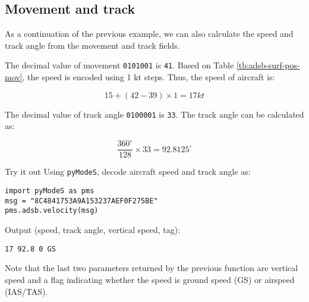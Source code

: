 \subsection{Movement and track}

As a continuation of the previous example, we can also calculate the speed and track angle from the movement and track fields.

The decimal value of movement \texttt{0101001} is \texttt{41}. Based on Table \ref{tb:adsb-surf-pos-mov}, the speed is encoded using 1 kt steps. Thus, the speed of aircraft is:

\begin{equation}
  15 + (42 - 39) \times 1 = 17 kt
\end{equation}

The decimal value of track angle \texttt{0100001} is \texttt{33}. The track angle can be calculated as:

\begin{equation}
  \frac{360^\circ}{128} \times 33 = 92.8125 ^\circ
\end{equation}

\begin{notebox}{Try it out}
Using \texttt{pyModeS}, decode aircraft speed and track angle as: 

\begin{verbatim}
import pyModeS as pms
msg = "8C4841753A9A153237AEF0F275BE"
pms.adsb.velocity(msg)
\end{verbatim}

Output (speed, track angle, vertical speed, tag): 

\begin{verbatim}
17 92.8 0 GS
\end{verbatim}


Note that the last two parameters returned by the previous function are vertical speed and a flag indicating whether the speed is ground speed (GS) or airspeed (IAS/TAS).

\end{notebox}
